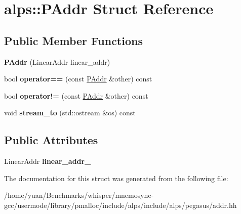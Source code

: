 \hypertarget{structalps_1_1PAddr}{}\section{alps\+:\+:P\+Addr Struct Reference}
\label{structalps_1_1PAddr}
\subsection*{Public Member Functions}
\begin{DoxyCompactItemize}
\item 
{\bfseries P\+Addr} (Linear\+Addr linear\+\_\+addr)\hypertarget{structalps_1_1PAddr_a8982be9f74d2315051a80e1caca63ed5}{}\label{structalps_1_1PAddr_a8982be9f74d2315051a80e1caca63ed5}

\item 
bool {\bfseries operator==} (const \hyperlink{structalps_1_1PAddr}{P\+Addr} \&other) const \hypertarget{structalps_1_1PAddr_a03b2b290453ddced8540cbff0fd3492f}{}\label{structalps_1_1PAddr_a03b2b290453ddced8540cbff0fd3492f}

\item 
bool {\bfseries operator!=} (const \hyperlink{structalps_1_1PAddr}{P\+Addr} \&other) const \hypertarget{structalps_1_1PAddr_a1afc56c34672ca32a62d81eed3be1fbb}{}\label{structalps_1_1PAddr_a1afc56c34672ca32a62d81eed3be1fbb}

\item 
void {\bfseries stream\+\_\+to} (std\+::ostream \&os) const \hypertarget{structalps_1_1PAddr_a9c0b6d407c42585d6061ea60cf163b3e}{}\label{structalps_1_1PAddr_a9c0b6d407c42585d6061ea60cf163b3e}

\end{DoxyCompactItemize}
\subsection*{Public Attributes}
\begin{DoxyCompactItemize}
\item 
Linear\+Addr {\bfseries linear\+\_\+addr\+\_\+}\hypertarget{structalps_1_1PAddr_ab0968857be1118d355e98c741838e7f9}{}\label{structalps_1_1PAddr_ab0968857be1118d355e98c741838e7f9}

\end{DoxyCompactItemize}


The documentation for this struct was generated from the following file\+:\begin{DoxyCompactItemize}
\item 
/home/yuan/\+Benchmarks/whisper/mnemosyne-\/gcc/usermode/library/pmalloc/include/alps/include/alps/pegasus/addr.\+hh\end{DoxyCompactItemize}

